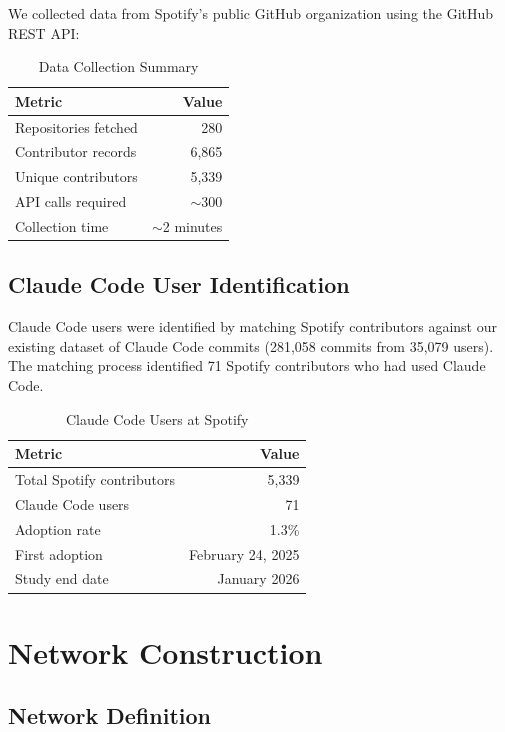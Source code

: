 \documentclass[11pt]{article}
\begin{document}
We collected data from Spotify's public GitHub organization using the GitHub REST API:

\begin{table}[H]
\centering
\caption{Data Collection Summary}
\label{tab:data}
\begin{tabular}{lr}
\toprule
\textbf{Metric} & \textbf{Value} \\
\midrule
Repositories fetched & 280 \\
Contributor records & 6,865 \\
Unique contributors & 5,339 \\
API calls required & $\sim$300 \\
Collection time & $\sim$2 minutes \\
\bottomrule
\end{tabular}
\end{table}

\subsection{Claude Code User Identification}

Claude Code users were identified by matching Spotify contributors against our existing dataset of Claude Code commits (281,058 commits from 35,079 users). The matching process identified 71 Spotify contributors who had used Claude Code.

\begin{table}[H]
\centering
\caption{Claude Code Users at Spotify}
\label{tab:claude_users}
\begin{tabular}{lr}
\toprule
\textbf{Metric} & \textbf{Value} \\
\midrule
Total Spotify contributors & 5,339 \\
Claude Code users & 71 \\
Adoption rate & 1.3\% \\
First adoption & February 24, 2025 \\
Study end date & January 2026 \\
\bottomrule
\end{tabular}
\end{table}

\section{Network Construction}

\subsection{Network Definition}
\end{document}
